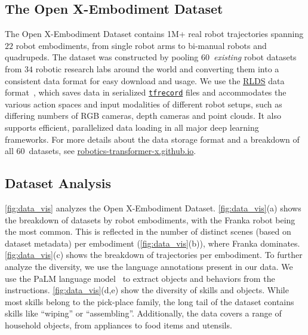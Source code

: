 \documentclass[letterpaper, 10 pt, conference]{ieeeconf}  %
\newcommand{\repo}{Open X-Embodiment\xspace}     %
\newcommand{\repourl}{\href{https://robotics-transformer-x.github.io}{robotics-transformer-x.github.io}}
\newcommand{\numembodiment}{22}
\newcommand{\numresearchlab}{34}
\newcommand{\numdatasets}{60}
\begin{document}
\subsection{The \repo Dataset}
\vspace{-0.1em}

The \repo Dataset contains 1M+ real robot trajectories spanning $\numembodiment$ robot embodiments, from single robot arms to bi-manual robots and quadrupeds. The dataset was constructed by pooling \numdatasets~\emph{existing} robot datasets from $\numresearchlab$ robotic research labs around the world and converting them into a consistent data format for easy download and usage.
We use the \href{https://github.com/google-research/rlds}{RLDS} data format~\cite{ramos2021rlds}, which saves data in serialized \href{https://www.tensorflow.org/tutorials/load_data/tfrecord}{\texttt{tfrecord}} files and accommodates the various action spaces and input modalities of different robot setups, such as differing numbers of RGB cameras, depth cameras and point clouds. It also supports efficient, parallelized data loading in all major deep learning frameworks. For more details about the data storage format and a breakdown of all \numdatasets~datasets, see \repourl.

\vspace{-0.25em}
\subsection{Dataset Analysis}
\vspace{-0.2em}

\cref{fig:data_vis} analyzes the \repo Dataset. %
\cref{fig:data_vis}(a) shows the breakdown of datasets by robot embodiments, with the Franka robot being the most common. This is reflected in the number of distinct scenes (based on dataset metadata) per embodiment (\cref{fig:data_vis}(b)), where Franka dominates. 
\cref{fig:data_vis}(c) shows the breakdown of trajectories per embodiment. 
To further analyze the diversity, we use the language annotations present in our data. We use the PaLM language model~\citep{anil2023palm} to extract objects and behaviors from the instructions. \cref{fig:data_vis}(d,e) show the diversity of skills and objects. While most skills belong to the pick-place family, the long tail of the dataset contains skills like ``wiping'' or ``assembling''. Additionally, the data covers a range of household objects, from appliances to food items and utensils. 
\end{document}
